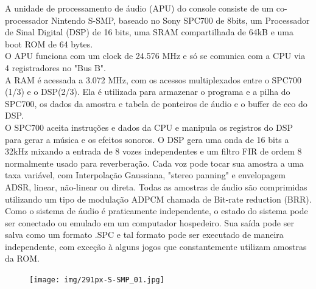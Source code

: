 \documentclass[paper=a4, fontsize=11pt]{scrartcl}	%
\numberwithin{equation}{section}															%
\numberwithin{figure}{section}																%
\numberwithin{table}{section}																%
\begin{document}
A unidade de processamento de áudio (APU) do console consiste de um co-processador Nintendo S-SMP, baseado no Sony SPC700 de 8bits, um Processador de Sinal Digital (DSP) de 16 bits, uma SRAM compartilhada de 64kB e uma boot ROM de 64 bytes.\\
O APU funciona com um clock de 24.576 MHz e só se comunica com a CPU via 4 registradores no "Bus B".\\
A RAM é acessada a 3.072 MHz, com os acessos multiplexados entre o SPC700 (1/3) e o DSP(2/3). Ela é utilizada para armazenar o programa e a pilha do SPC700, os dados da amostra e tabela de ponteiros de áudio e o buffer de eco do DSP.\\

O SPC700 aceita instruções e dados da CPU e manipula os registros do DSP para gerar a música e os efeitos sonoros. O DSP gera uma onda de 16 bits a 32kHz mixando a entrada de 8 vozes independentes e um filtro FIR de ordem 8 normalmente usado para reverberação. Cada voz pode tocar sua amostra a uma taxa variável, com Interpolação Gaussiana, "stereo panning" e envelopagem ADSR, linear, não-linear ou direta. Todas as amostras de áudio são comprimidas utilizando um tipo de modulação ADPCM chamada de Bit-rate reduction (BRR).\\

Como o sistema de áudio é praticamente independente, o estado do sistema pode ser conectado ou emulado em um computador hospedeiro. Sua saída pode ser salva como um formato .SPC e tal formato pode ser executado de maneira independente, com exceção à alguns jogos que constantemente utilizam amostras da ROM.\cite{AnomieDSPDoc}\cite{AnomieSPC700Doc}\cite{ApuManual}\\

\begin{figure}[h!]
	\centering
    \texttt{[image: img/291px-S-SMP\_01.jpg]}
\end{figure}
\end{document}
